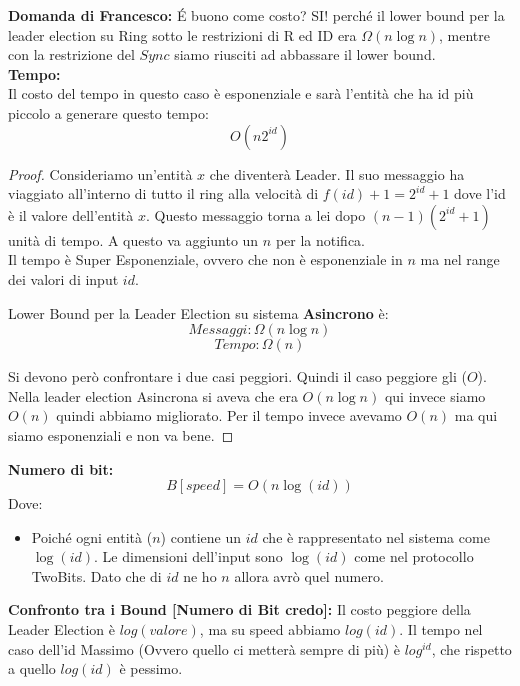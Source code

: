 \textbf{Domanda di Francesco:}
\'E buono come costo? SI! perché il lower bound per la leader election su Ring
sotto le restrizioni di R ed ID era $\Omega(n \log n)$, mentre con la
restrizione del $Sync$ siamo riusciti ad abbassare il lower bound.\\

\textbf{Tempo:}\\
Il costo del tempo in questo caso è esponenziale e sarà l'entità che ha id più
piccolo a generare questo tempo: $$O(n 2^{id})$$

\begin{proof}
    Consideriamo
    un'entità $x$ che diventerà Leader. Il suo messaggio ha viaggiato all'interno di
    tutto il ring alla velocità di $f(id)+1 = 2^{id}+1$ dove l'id è il valore
    dell'entità $x$. Questo messaggio torna a lei dopo $(n-1)(2^{id}+1)$ unità di
    tempo. A questo va aggiunto un $n$ per la notifica.\\
    Il tempo è Super Esponenziale, ovvero che non è esponenziale in $n$ ma nel range
    dei valori di input $id$.\\

    \begin{center}
        Lower Bound per la Leader Election su sistema \textbf{Asincrono} è:
        $$Messaggi: \Omega(n \log n) $$ $$Tempo: \Omega(n)$$
    \end{center}

    Si devono però confrontare i due casi peggiori. Quindi il caso peggiore gli
    ($O$). Nella leader election Asincrona si aveva che era $O(n \log n)$ qui invece
    siamo $O(n)$ quindi abbiamo migliorato. Per il tempo invece avevamo $O(n)$ ma
    qui siamo esponenziali e non va bene.
\end{proof}

\textbf{Numero di bit:} $$B[speed] = O(n \log(id))$$ Dove:
\begin{itemize}
    \item Poiché ogni entità ($n$) contiene un $id$ che è rappresentato nel
          sistema come $\log(id)$. Le dimensioni dell'input sono $\log(id)$ come nel
          protocollo TwoBits. Dato che di $id$ ne ho $n$ allora avrò quel numero.
\end{itemize}

\textbf{Confronto tra i Bound [Numero di Bit credo]:}
Il costo peggiore della Leader Election è $log(valore)$, ma su speed abbiamo
$log(id)$. Il tempo nel caso dell'id Massimo (Ovvero quello ci metterà sempre di
più) è $log^{id}$, che rispetto a quello $log(id)$ è pessimo.


